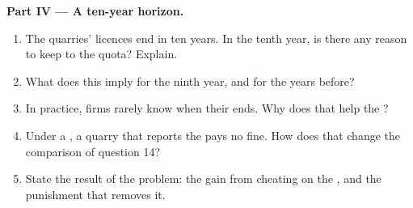 \begin{problem}
\medskip
\noindent\textbf{Part IV --- A ten-year horizon.}
\begin{enumerate}[resume]
\item The quarries' licences end in ten years. In the tenth year, is there any reason to keep to the quota? Explain.
\item What does this imply for the ninth year, and for the years before?
\item In practice, firms rarely know when their  ends. Why does that help the ?
\item Under a , a quarry that reports the  pays no fine. How does that change the comparison of question 14?
\item State the result of the problem: the gain from cheating on the , and the punishment that removes it.
\end{enumerate}
\end{problem}
